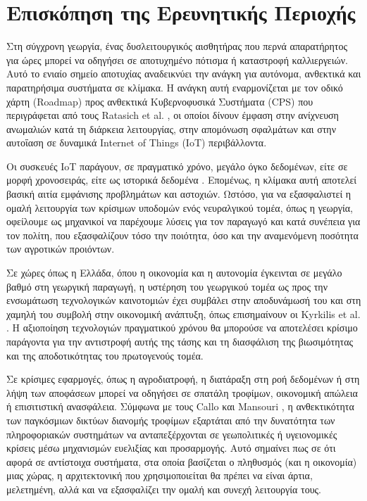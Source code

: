 \chapter{Επισκόπηση της Ερευνητικής Περιοχής}

Στη σύγχρονη γεωργία, ένας δυσλειτουργικός αισθητήρας που περνά απαρατήρητος
για ώρες μπορεί να οδηγήσει σε αποτυχημένο πότισμα ή καταστροφή καλλιεργειών.
Αυτό το ενιαίο σημείο αποτυχίας αναδεικνύει την ανάγκη για αυτόνομα, ανθεκτικά
και παρατηρήσιμα συστήματα σε κλίμακα. Η ανάγκη αυτή εναρμονίζεται με τον οδικό
χάρτη (Roadmap) προς ανθεκτικά Κυβερνοφυσικά Συστήματα (CPS) που περιγράφεται
από τους Ratasich et al. \cite{iotcps}, οι οποίοι δίνουν έμφαση στην ανίχνευση
ανωμαλιών κατά τη διάρκεια λειτουργίας, στην απομόνωση σφαλμάτων και στην
αυτοΐαση σε δυναμικά Internet of Things (IoT) περιβάλλοντα.

Οι συσκευές IoT παράγουν, σε πραγματικό χρόνο, μεγάλο όγκο δεδομένων, είτε σε
μορφή χρονοσειράς, είτε ως ιστορικά δεδομένα \cite{rtiotevents}. Επομένως, η
κλίμακα αυτή αποτελεί βασική αιτία εμφάνισης προβλημάτων και αστοχιών. Ωστόσο,
για να εξασφαλιστεί η ομαλή λειτουργία των κρίσιμων υποδομών ενός νευραλγικού
τομέα, όπως η γεωργία, οφείλουμε ως μηχανικοί να παρέχουμε λύσεις για τον
παραγωγό και κατά συνέπεια για τον πολίτη, που εξασφαλίζουν τόσο την ποιότητα,
όσο και την αναμενόμενη ποσότητα των αγροτικών προιόντων.

Σε χώρες όπως η Ελλάδα, όπου η οικονομία και η αυτονομία έγκεινται σε μεγάλο
βαθμό στη γεωργική παραγωγή, η υστέρηση του γεωργικού τομέα ως προς την
ενσωμάτωση τεχνολογικών καινοτομιών έχει συμβάλει στην αποδυνάμωσή του και στη
χαμηλή του συμβολή στην οικονομική ανάπτυξη, όπως επισημαίνουν οι Kyrkilis et
al. \cite{gragriculture}. Η αξιοποίηση τεχνολογιών πραγματικού χρόνου θα
μπορούσε να αποτελέσει κρίσιμο παράγοντα για την αντιστροφή αυτής της τάσης και
τη διασφάλιση της βιωσιμότητας και της αποδοτικότητας του πρωτογενούς τομέα.

Σε κρίσιμες εφαρμογές, όπως η αγροδιατροφή, η διατάραξη στη ροή δεδομένων ή στη
λήψη των αποφάσεων μπορεί να οδηγήσει σε σπατάλη τροφίμων, οικονομική απώλεια ή
επισιτιστική ανασφάλεια. Σύμφωνα με τους Callo και Mansouri \cite{foodsec}, η
ανθεκτικότητα των παγκόσμιων δικτύων διανομής τροφίμων εξαρτάται από την
δυνατότητα των πληροφοριακών συστημάτων να ανταπεξέρχονται σε γεωπολιτικές ή
υγειονομικές κρίσεις μέσω μηχανισμών ευελιξίας και προσαρμογής. Αυτό σημαίνει
πως σε ότι αφορά σε αντίστοιχα συστήματα, στα οποία βασίζεται ο πληθυσμός (και
η οικονομία) μιας χώρας, η αρχιτεκτονική που χρησιμοποιείται θα πρέπει να είναι
άρτια, μελετημένη, αλλά και να εξασφαλίζει την ομαλή και συνεχή λειτουργία
τους.

